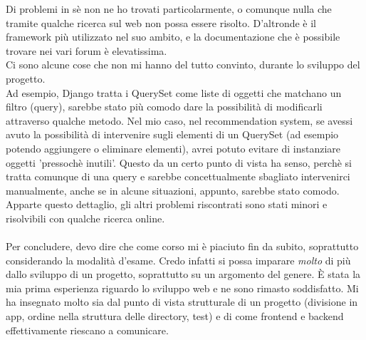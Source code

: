 \documentclass[12pt]{article}
\begin{document}
	\noindent Di problemi in sè non ne ho trovati particolarmente, o comunque nulla che tramite qualche ricerca sul web non possa essere risolto. D'altronde è il framework più utilizzato nel suo ambito, e la documentazione che è possibile trovare nei vari forum è elevatissima. \\
	Ci sono alcune cose che non mi hanno del tutto convinto, durante lo sviluppo del progetto. \\
	Ad esempio, Django tratta i QuerySet come liste di oggetti che matchano un filtro (query), sarebbe stato più comodo dare la possibilità di modificarli attraverso qualche metodo. Nel mio caso, nel recommendation system, se avessi avuto la possibilità di intervenire sugli elementi di un QuerySet (ad esempio potendo aggiungere o eliminare elementi), avrei potuto evitare di instanziare oggetti 'pressochè inutili'. Questo da un certo punto di vista ha senso, perchè si tratta comunque di una query e sarebbe concettualmente sbagliato intervenirci manualmente, anche se in alcune situazioni, appunto, sarebbe stato comodo. Apparte questo dettaglio, gli altri problemi riscontrati sono stati minori e risolvibili con qualche ricerca online. \\ \\
	Per concludere, devo dire che come corso mi è piaciuto fin da subito, soprattutto considerando la modalità d'esame. Credo infatti si possa imparare \textit{molto} di più dallo sviluppo di un progetto, soprattutto su un argomento del genere. È stata la mia prima esperienza riguardo lo sviluppo web e ne sono rimasto soddisfatto. Mi ha insegnato molto sia dal punto di vista strutturale di un progetto (divisione in app, ordine nella struttura delle directory, test) e di come frontend e backend effettivamente riescano a comunicare. \\
	
	
	
	
\end{document}
